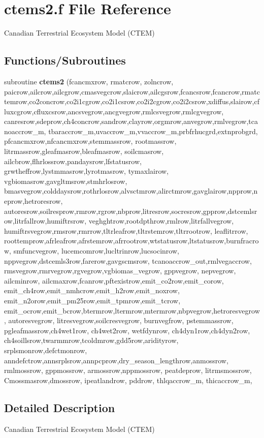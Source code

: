 \hypertarget{ctems2_8f}{}\section{ctems2.\+f File Reference}
\label{ctems2_8f}


Canadian Terrestrial Ecosystem Model (C\+T\+E\+M)  


\subsection*{Functions/\+Subroutines}
\begin{DoxyCompactItemize}
\item 
\hypertarget{ctems2_8f_a5f85a6ff85ff04495c6befd781e4e9f8}{}subroutine {\bfseries ctems2} (fcancmxrow, rmatcrow, zolncrow, paicrow,ailcrow,ailcgrow,cmasvegcrow,slaicrow,ailcgsrow,fcancsrow,fcancrow,rmatctemrow,co2concrow,co2i1cgrow,co2i1csrow,co2i2cgrow,co2i2csrow,xdiffus,slairow,cfluxcgrow,cfluxcsrow,ancsvegrow,ancgvegrow,rmlcsvegrow,rmlcgvegrow, canresrow,sdeprow,ch4concrow,sandrow,clayrow,orgmrow,anvegrow,rmlvegrow,tcanoaccrow\+\_\+m, tbaraccrow\+\_\+m,uvaccrow\+\_\+m,vvaccrow\+\_\+m,prbfrhucgrd,extnprobgrd, pfcancmxrow,nfcancmxrow,stemmassrow, rootmassrow, litrmassrow,gleafmasrow,bleafmasrow, soilcmasrow, ailcbrow,flhrlossrow,pandaysrow,lfstatusrow, grwtheffrow,lystmmasrow,lyrotmasrow, tymaxlairow, vgbiomasrow,gavgltmsrow,stmhrlosrow, bmasvegrow,colddaysrow,rothrlosrow,alvsctmrow,alirctmrow,gavglairow,npprow,neprow,hetroresrow, autoresrow,soilresprow,rmrow,rgrow,nbprow,litresrow,socresrow,gpprow,dstcemlsrow,litrfallrow,humiftrsrow, veghghtrow,rootdpthrow,rmlrow,litrfallvegrow, humiftrsvegrow,rmsrow,rmrrow,tltrleafrow,tltrstemrow,tltrrootrow, leaflitrrow, roottemprow,afrleafrow,afrstemrow,afrrootrow,wtstatusrow,ltstatusrow,burnfracrow, smfuncvegrow, lucemcomrow,lucltrinrow,lucsocinrow, nppvegrow,dstcemls3row,farerow,gavgscmsrow, tcanoaccrow\+\_\+out,rmlvegaccrow, rmsvegrow,rmrvegrow,rgvegrow,vgbiomas\+\_\+vegrow, gppvegrow, nepvegrow, ailcminrow, ailcmaxrow,fcanrow,pftexistrow,emit\+\_\+co2row,emit\+\_\+corow, emit\+\_\+ch4row,emit\+\_\+nmhcrow,emit\+\_\+h2row,emit\+\_\+noxrow, emit\+\_\+n2orow,emit\+\_\+pm25row,emit\+\_\+tpmrow,emit\+\_\+tcrow, emit\+\_\+ocrow,emit\+\_\+bcrow,btermrow,ltermrow,mtermrow,nbpvegrow,hetroresvegrow, autoresvegrow, litresvegrow,soilcresvegrow, burnvegfrow, pstemmassrow, pgleafmassrow,ch4wet1row, ch4wet2row, wetfdynrow, ch4dyn1row,ch4dyn2row, ch4soillsrow,twarmmrow,tcoldmrow,gdd5row,aridityrow, srplsmonrow,defctmonrow, anndefctrow,annsrplsrow,annpcprow,dry\+\_\+season\+\_\+lengthrow,anmossrow, rmlmossrow, gppmossrow, armossrow,nppmossrow, peatdeprow, litrmsmossrow, Cmossmasrow,dmossrow, ipeatlandrow, pddrow, thlqaccrow\+\_\+m, thicaccrow\+\_\+m,\label{ctems2_8f_a5f85a6ff85ff04495c6befd781e4e9f8}

\end{DoxyCompactItemize}


\subsection{Detailed Description}
Canadian Terrestrial Ecosystem Model (C\+T\+E\+M) 

